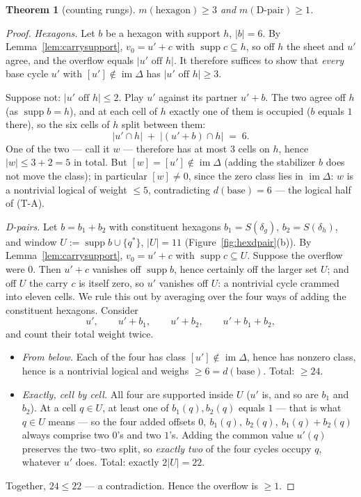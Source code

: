 \documentclass[11pt]{article}
\theoremstyle{plain}
\newtheorem{theorem}{Theorem}[section]
\theoremstyle{definition}
\theoremstyle{remark}
\newcommand{\suppop}{\operatorname{supp}}
\newcommand{\imD}{\operatorname{im}\Delta}
\newcommand{\base}{\mathrm{base}}
\newcommand{\wt}[1]{\lvert #1\rvert}
\begin{document}
\begin{theorem}[counting rungs]\label{thm:rungs}
$m(\text{hexagon}) \geq 3$ and $m(\text{D-pair}) \geq 1$.
\end{theorem}

\begin{proof}
\emph{Hexagons.} Let $b$ be a hexagon with support $h$, $\wt{b} = 6$. By
Lemma~\ref{lem:carrysupport}, $v_0 = u' + c$ with $\suppop c \subseteq h$,
so off $h$ the sheet and $u'$ agree, and the overflow equals
$\wt{u' \text{ off } h}$. It therefore suffices to show that \emph{every}
base cycle $u'$ with $[u'] \notin \imD$ has $\wt{u' \text{ off } h} \geq
3$.

Suppose not: $\wt{u' \text{ off } h} \leq 2$. Play $u'$ against its
partner $u' + b$. The two agree off $h$ (as $\suppop b = h$), and at each
cell of $h$ exactly one of them is occupied ($b$ equals $1$ there), so the
six cells of $h$ split between them:
\[
\wt{u' \cap h} \;+\; \wt{(u'+b) \cap h} \;=\; 6 .
\]
One of the two --- call it $w$ --- therefore has at most $3$ cells on $h$,
hence $\wt{w} \leq 3 + 2 = 5$ in total. But $[w] = [u'] \notin \imD$
(adding the stabilizer $b$ does not move the class); in particular
$[w] \neq 0$, since the zero class lies in $\imD$: $w$ is a nontrivial
logical of weight $\leq 5$, contradicting $d(\base) = 6$ --- the logical
half of (T-A).

\emph{D-pairs.} Let $b = b_1 + b_2$ with constituent hexagons
$b_1 = S(\delta_g)$, $b_2 = S(\delta_h)$, and window
$U := \suppop b \cup \{q^*\}$, $|U| = 11$
(Figure~\ref{fig:hexdpair}(b)). By Lemma~\ref{lem:carrysupport},
$v_0 = u' + c$ with $\suppop c \subseteq U$. Suppose the overflow were
$0$. Then $u' + c$ vanishes off $\suppop b$, hence certainly off the
larger set $U$; and off $U$ the carry $c$ is itself zero, so $u'$ vanishes
off $U$: a nontrivial cycle crammed into eleven cells. We rule this out by
averaging over the four ways of adding the constituent hexagons. Consider
\[
u',\qquad u' + b_1,\qquad u' + b_2,\qquad u' + b_1 + b_2 ,
\]
and count their total weight twice.
\begin{itemize}[leftmargin=2em]
\item \emph{From below.} Each of the four has class $[u'] \notin \imD$,
  hence has nonzero class, hence is a nontrivial logical and weighs
  $\geq 6 = d(\base)$. Total: $\geq 24$.
\item \emph{Exactly, cell by cell.} All four are supported inside $U$
  ($u'$ is, and so are $b_1$ and $b_2$). At a cell $q \in U$, at least
  one of $b_1(q), b_2(q)$ equals $1$ --- that is what $q \in U$ means ---
  so the four added offsets $0,\ b_1(q),\ b_2(q),\ b_1(q){+}b_2(q)$
  always comprise two $0$'s and two $1$'s. Adding the common value
  $u'(q)$ preserves the two--two split, so \emph{exactly two} of the four
  cycles occupy $q$, whatever $u'$ does. Total: exactly $2|U| = 22$.
\end{itemize}
Together, $24 \leq 22$ --- a contradiction. Hence the overflow is
$\geq 1$.
\end{proof}
\end{document}
